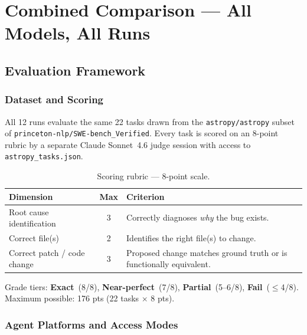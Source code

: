 
\section{Combined Comparison --- All Models, All Runs}
\label{sec:combined}

\subsection{Evaluation Framework}

\subsubsection{Dataset and Scoring}

All 12 runs evaluate the same 22 tasks drawn from the
\texttt{astropy/astropy} subset of \texttt{princeton-nlp/SWE-bench\_Verified}.
Every task is scored on an 8-point rubric by a separate Claude Sonnet~4.6
judge session with access to \texttt{astropy\_tasks.json}.

\begin{table}[h]
\centering
\caption{Scoring rubric --- 8-point scale.}\label{tab:rubric}
\begin{tabular}{lcp{8cm}}
\toprule
\textbf{Dimension} & \textbf{Max} & \textbf{Criterion} \\
\midrule
Root cause identification   & 3 & Correctly diagnoses \emph{why} the bug exists. \\
Correct file(s)             & 2 & Identifies the right file(s) to change. \\
Correct patch / code change & 3 & Proposed change matches ground truth or is functionally equivalent. \\
\bottomrule
\end{tabular}
\end{table}

\noindent
Grade tiers: \textbf{Exact}~(8/8), \textbf{Near-perfect}~(7/8),
\textbf{Partial}~(5--6/8), \textbf{Fail}~($\le$4/8).
Maximum possible: 176 pts (22 tasks $\times$ 8 pts).

\subsubsection{Agent Platforms and Access Modes}

